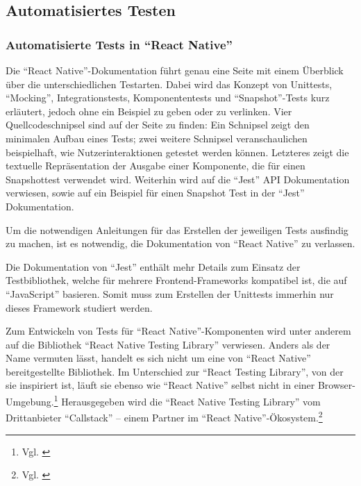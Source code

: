 
\subsection{Automatisiertes Testen}

\subsubsection{Automatisierte Tests in \enquote{React Native}} Die \enquote{React Native}-Dokumentation führt genau eine Seite mit einem Überblick über die unterschiedlichen Testarten.
Dabei wird das Konzept von Unittests, \enquote{Mocking}, Integrationstests, Komponententests und \enquote{Snapshot}-Tests kurz erläutert, jedoch ohne ein Beispiel zu geben oder zu verlinken.
Vier Quellcodeschnipsel sind auf der Seite zu finden: Ein Schnipsel zeigt den minimalen Aufbau eines Tests; zwei weitere Schnipsel veranschaulichen beispielhaft, wie Nutzerinteraktionen getestet werden können.
Letzteres zeigt die textuelle Repräsentation der Ausgabe einer Komponente, die für einen Snapshottest verwendet wird.
Weiterhin wird auf die \enquote{Jest} API Dokumentation verwiesen, sowie auf ein Beispiel für einen Snapshot Test in der \enquote{Jest} Dokumentation.

Um die notwendigen Anleitungen für das Erstellen der jeweiligen Tests ausfindig zu machen, ist es notwendig, die Dokumentation von \enquote{React Native} zu verlassen.

Die Dokumentation von \enquote{Jest} enthält mehr Details zum Einsatz der Testbibliothek, welche für mehrere Frontend-Frameworks kompatibel ist,
die auf \enquote{JavaScript} basieren.
Somit muss zum Erstellen der Unittests immerhin nur dieses Framework studiert werden.

Zum Entwickeln von Tests für \enquote{React Native}-Komponenten wird unter anderem auf die Bibliothek \enquote{React Native Testing Library} verwiesen.
Anders als der Name vermuten lässt, handelt es sich nicht um eine von \enquote{React Native} bereitgestellte Bibliothek.
Im Unterschied zur \enquote{React Testing Library}, von der sie inspiriert ist, läuft sie  ebenso  wie \enquote{React Native} selbst nicht in einer Browser-Umgebung.\footnote{Vgl. \cite{NativeTestingLibraryIntroduction}}
Herausgegeben wird die \enquote{React Native Testing Library} vom Drittanbieter \enquote{Callstack} -- einem Partner im \enquote{React Native}-Ökosystem.\footnote{Vgl. \cite{TheReactNativeEcosystem}}

